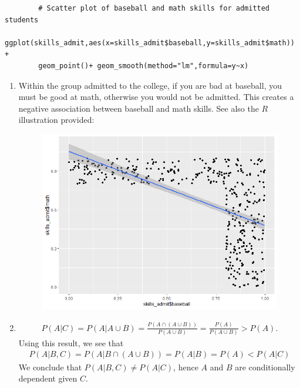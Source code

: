 \begin{exercise}[BH.2.36]
\begin{solution}
\begin{verbatim}
        # Scatter plot of baseball and math skills for admitted students
        ggplot(skills_admit,aes(x=skills_admit$baseball,y=skills_admit$math)) +
        geom_point()+ geom_smooth(method="lm",formula=y~x)
    \end{verbatim}
    \begin{enumerate}
        \item Within the group admitted to the college, if you are bad at baseball, you must be good at math, otherwise you would not be admitted. This creates a negative association between baseball and math skills. See also the $R$ illustration provided:
        \begin{figure}[htbp!]
            \includegraphics[width=0.5\columnwidth]{figures/bh-2.36-figure.png}
        \end{figure}
        \item \begin{align*}
            P(A|C) =P(A|A\cup B) = \frac{P(A\cap(A\cup B))}{P(A\cup B)} = \frac{P(A)}{P(A\cup B)}>P(A).
        \end{align*}
        Using this result, we see that
        \begin{align*}
            P(A|B,C) = P(A|B\cap (A\cup B)) =P(A|B) = P(A)<P(A|C)
        \end{align*}
        We conclude that $P(A|B,C)\neq P(A|C)$, hence $A$ and $B$ are conditionally dependent given $C$.
    \end{enumerate}
\end{solution}
\end{exercise}

